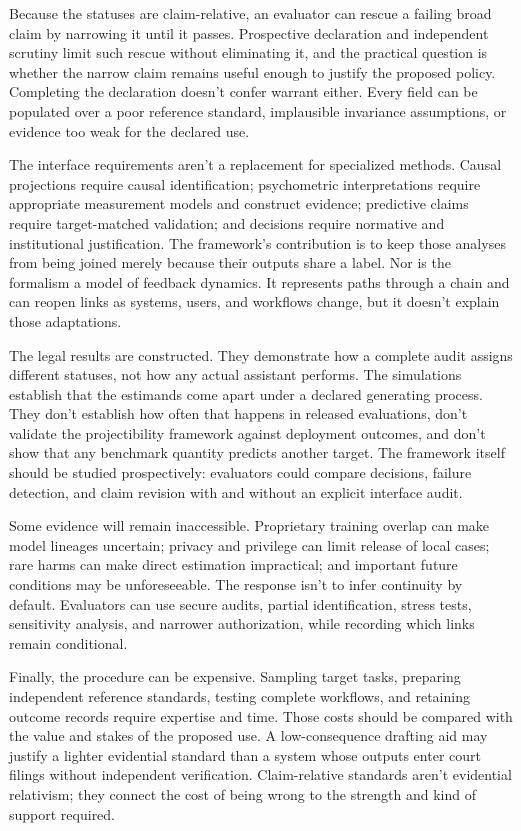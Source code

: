 \documentclass[12pt]{article}
\begin{document}
Because the statuses are claim-relative, an evaluator can rescue a failing broad claim by narrowing it until it passes. Prospective declaration and independent scrutiny limit such rescue without eliminating it, and the practical question is whether the narrow claim remains useful enough to justify the proposed policy. Completing the declaration doesn't confer warrant either. Every field can be populated over a poor reference standard, implausible invariance assumptions, or evidence too weak for the declared use.

The interface requirements aren't a replacement for specialized methods. Causal projections require causal identification; psychometric interpretations require appropriate measurement models and construct evidence; predictive claims require target-matched validation; and decisions require normative and institutional justification. The framework's contribution is to keep those analyses from being joined merely because their outputs share a label. Nor is the formalism a model of feedback dynamics. It represents paths through a chain and can reopen links as systems, users, and workflows change, but it doesn't explain those adaptations.

The legal results are constructed. They demonstrate how a complete audit assigns different statuses, not how any actual assistant performs. The simulations establish that the estimands come apart under a declared generating process. They don't establish how often that happens in released evaluations, don't validate the projectibility framework against deployment outcomes, and don't show that any benchmark quantity predicts another target. The framework itself should be studied prospectively: evaluators could compare decisions, failure detection, and claim revision with and without an explicit interface audit.

Some evidence will remain inaccessible. Proprietary training overlap can make model lineages uncertain; privacy and privilege can limit release of local cases; rare harms can make direct estimation impractical; and important future conditions may be unforeseeable. The response isn't to infer continuity by default. Evaluators can use secure audits, partial identification, stress tests, sensitivity analysis, and narrower authorization, while recording which links remain conditional.

Finally, the procedure can be expensive. Sampling target tasks, preparing independent reference standards, testing complete workflows, and retaining outcome records require expertise and time. Those costs should be compared with the value and stakes of the proposed use. A low-consequence drafting aid may justify a lighter evidential standard than a system whose outputs enter court filings without independent verification. Claim-relative standards aren't evidential relativism; they connect the cost of being wrong to the strength and kind of support required.
\end{document}
